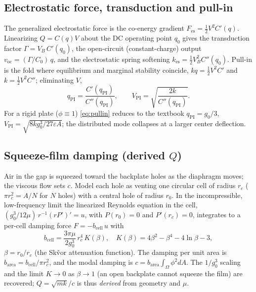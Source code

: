\documentclass[conference]{IEEEtran}
\begin{document}
\subsection{Electrostatic force, transduction and pull-in}
The generalized electrostatic force is the co-energy gradient
$F_\mathrm{es}=\tfrac12 V^2 C'(q)$. Linearizing $Q=C(q)V$ about the DC operating
point $q_0$ gives the transduction factor $\Gamma=V_B\,C'(q_0)$, the
open-circuit (constant-charge) output $v_\mathrm{oc}=(\Gamma/C_0)\,q$, and the
electrostatic spring softening $k_\mathrm{es}=\tfrac12 V_B^2 C''(q_0)$. Pull-in
is the fold where equilibrium and marginal stability coincide,
$k q=\tfrac12 V^2 C'$ and $k=\tfrac12 V^2 C''$; eliminating $V$,
\begin{equation}
q_\mathrm{PI}=\frac{C'(q_\mathrm{PI})}{C''(q_\mathrm{PI})},\qquad
V_\mathrm{PI}=\sqrt{\frac{2k}{C''(q_\mathrm{PI})}} .
\label{eq:pullin}
\end{equation}
For a rigid plate ($\phi\equiv1$) \eqref{eq:pullin} reduces to the textbook
$q_\mathrm{PI}=g_0/3$, $V_\mathrm{PI}=\sqrt{8kg_0^3/27\varepsilon A}$; the
distributed mode collapses at a larger center deflection.

\subsection{Squeeze-film damping (derived $Q$)}\label{sec:squeeze}
Air in the gap is squeezed toward the backplate holes as the diaphragm moves;
the viscous flow sets $c$. Model each hole as venting one circular cell of radius
$r_c$ ($\pi r_c^2=A/N$ for $N$ holes) with a central hole of radius $r_0$. In the
incompressible, low-frequency limit the linearized Reynolds equation in the cell,
$(g_0^3/12\mu)\,r^{-1}(rP')' = u$, with $P(r_0)=0$ and $P'(r_c)=0$, integrates to
a per-cell damping force $F=-b_\mathrm{cell}\,u$ with
\begin{equation}
b_\mathrm{cell}=\frac{3\pi\mu}{2 g_0^3}\,r_c^4\,K(\beta),\quad
K(\beta)=4\beta^2-\beta^4-4\ln\beta-3,
\label{eq:skvor}
\end{equation}
$\beta=r_0/r_c$ (the Sk\v{v}or attenuation function). The damping per unit area
is $b_\mathrm{area}=b_\mathrm{cell}/\pi r_c^2$, and the modal damping is
$c=b_\mathrm{area}\!\int_\Omega\phi^2 dA$. The $1/g_0^3$ scaling and the limit
$K\!\to\!0$ as $\beta\!\to\!1$ (an open backplate cannot squeeze the film) are
recovered; $Q=\sqrt{mk}/c$ is thus \emph{derived} from geometry and $\mu$.
\end{document}
